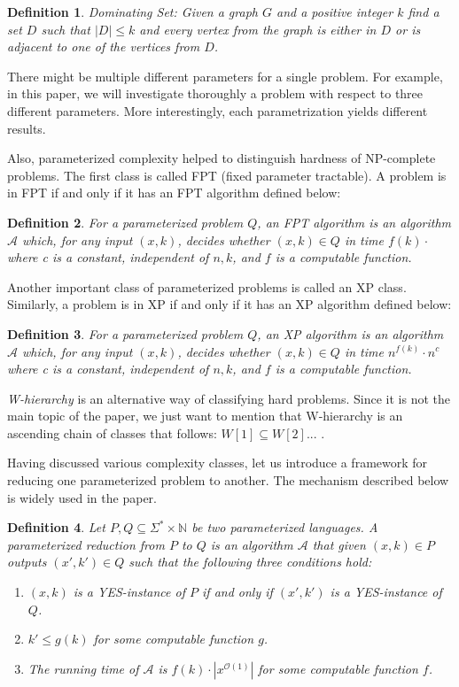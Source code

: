 \documentclass[en]{pracamgr}
\newtheorem{definition}{Definition}
\newcommand{\domsetp}{{\sc Dominating Set}}
\begin{document}
\begin{definition}
	\domsetp{}: Given a graph $G$ and a positive integer $k$ find a set $D$ such that $|D| \leq k$ and every vertex from the graph is either in $D$ or is adjacent to one of the vertices from $D$.
\end{definition}

There might be multiple different parameters for a single problem. For example, in this paper, we will investigate thoroughly a problem with respect to three different parameters. More interestingly, each parametrization yields different results. 

Also, parameterized complexity helped to distinguish hardness of NP-complete problems. The first class is called FPT (fixed parameter tractable). A problem is in FPT if and only if it has an FPT algorithm defined below:

\begin{definition}\label{FPT algorithm}
	For a parameterized problem $Q$, an \textup{FPT algorithm} is an algorithm $\mathcal{A}$ which, for any input $(x,k)$, decides whether $(x,k) \in Q$ in time $f(k)\cdot $ where c is a constant, independent of $n,k$, and $f$ is a computable function.
\end{definition}

Another important class of parameterized problems is called an XP class. Similarly, a problem is in XP if and only if it has an XP algorithm defined below:

\begin{definition}
	For a parameterized problem $Q$, an \textup{XP algorithm} is an algorithm $\mathcal{A}$ which, for any input $(x,k)$, decides whether $(x,k) \in Q$ in time $n^{f(k)}\cdot n^c$ where c is a constant, independent of $n,k$, and $f$ is a computable function.
\end{definition}

\emph{W-hierarchy} is an alternative way of classifying hard problems. Since it is not the main topic of the paper, we just want to mention that W-hierarchy is an ascending chain of classes that follows: $W[1] \subseteq W[2]...$ . 

Having discussed various complexity classes, let us introduce a framework for reducing one parameterized problem to another. The mechanism described below is widely used in the paper.

\begin{definition}
	Let $P,Q \subseteq \Sigma^* \times \mathbb{N}$ be two parameterized languages. A  \textup{parameterized reduction} from $P$ to $Q$ is an algorithm $\mathcal{A}$ that given $(x,k) \in P$ outputs $(x',k') \in Q$ such that the following three conditions hold:
	\begin{enumerate}
		\item $(x,k)$ is a YES-instance of $P$ if and only if $(x',k')$ is a YES-instance of $Q$.
		\item $k' \leq g(k)$ for some computable function $g$.
		\item The running time of $\mathcal{A}$ is $f(k) \cdot |x^{\mathcal{O}(1)}|$ for some computable function $f$.
	\end{enumerate}
\end{definition}
\end{document}
